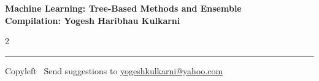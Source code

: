 \documentclass[8pt,landscape]{article}
\begin{document}
\footnotesize


\begin{center}
\Large{\textbf{Machine Learning: Tree-Based Methods and Ensemble\\ Compilation: Yogesh Haribhau Kulkarni}}
\end{center}

\begin{multicols}{2}

\end{multicols}

\rule{\linewidth}{0.25pt}
\scriptsize
Copyleft \textcopyleft\  Send suggestions to
\href{http://www.yogeshkulkarni.com}{yogeshkulkarni@yahoo.com}
\end{document}
